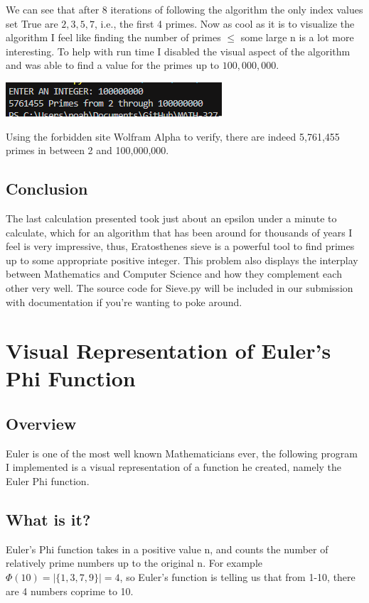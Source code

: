 \documentclass{article}
\begin{document}
We can see that after 8 iterations of following the algorithm the only index values set True are $2,3,5,7$, i.e., the first 4 primes. 
Now as cool as it is to visualize the algorithm I feel like finding the number of primes $\leq$ some large n is a lot more interesting.
To help with run time I disabled the visual aspect of the algorithm and was able to find a value for the primes up to $100,000,000$.
\begin{center}
  \includegraphics[scale=1.0]{primesFound.png}
\end{center}
Using the forbidden site Wolfram Alpha to verify, there are indeed 5,761,455 primes in between 2 and 100,000,000.
\subsection{Conclusion}
The last calculation presented took just about an epsilon under a minute to calculate, which for an algorithm that has been around for thousands of years
I feel is very impressive, thus, Eratosthenes sieve is a powerful tool to find primes up to some appropriate positive integer. This problem also displays the interplay between Mathematics 
and Computer Science and how they complement each other very well. The source code for Sieve.py will be included in our submission with documentation if you're
wanting to poke around.

\newpage
\section{Visual Representation of Euler's Phi Function}
\subsection{Overview}
Euler is one of the most well known Mathematicians ever, the following program I implemented 
is a visual representation of a function he created, namely the Euler Phi function.
\subsection{What is it?}
Euler's Phi function takes in a positive value n, and counts the number of relatively prime numbers up to the original n.
For example $\Phi(10)= |\{1,3,7,9\}| = 4$, so Euler's function is telling us that from 1-10, there are 4 numbers coprime to 10.
\end{document}
